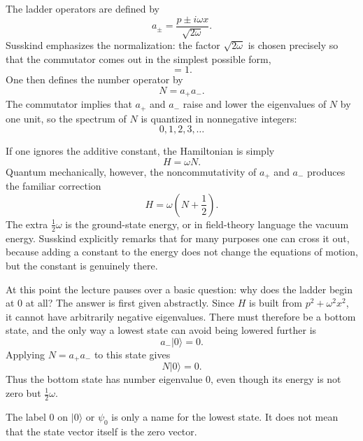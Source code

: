 The ladder operators are defined by
\begin{equation}
a_{\pm}=\frac{p\pm i\omega x}{\sqrt{2\omega}}.
\end{equation}
Susskind emphasizes the normalization: the factor \(\sqrt{2\omega}\) is chosen precisely so that the commutator comes out in the simplest possible form,
\begin{equation}
[a_{-},a_{+}]=1.
\end{equation}
One then defines the number operator by
\begin{equation}
N=a_{+}a_{-}.
\end{equation}
The commutator implies that \(a_{+}\) and \(a_{-}\) raise and lower the eigenvalues of \(N\) by one unit, so the spectrum of \(N\) is quantized in nonnegative integers:
\[
0,1,2,3,\ldots
\]

If one ignores the additive constant, the Hamiltonian is simply
\begin{equation}
H=\omega N.
\end{equation}
Quantum mechanically, however, the noncommutativity of \(a_{+}\) and \(a_{-}\) produces the familiar correction
\begin{equation}
H=\omega\left(N+\frac{1}{2}\right).
\end{equation}
The extra \(\tfrac{1}{2}\omega\) is the ground-state energy, or in field-theory language the vacuum energy. Susskind explicitly remarks that for many purposes one can cross it out, because adding a constant to the energy does not change the equations of motion, but the constant is genuinely there.

At this point the lecture pauses over a basic question: why does the ladder begin at \(0\) at all? The answer is first given abstractly. Since \(H\) is built from \(p^{2}+\omega^{2}x^{2}\), it cannot have arbitrarily negative eigenvalues. There must therefore be a bottom state, and the only way a lowest state can avoid being lowered further is
\begin{equation}
a_{-}|0\rangle=0.
\end{equation}
Applying \(N=a_{+}a_{-}\) to this state gives
\begin{equation}
N|0\rangle=0.
\end{equation}
Thus the bottom state has number eigenvalue \(0\), even though its energy is not zero but \(\tfrac{1}{2}\omega\).

\begin{remark}
The label \(0\) on \(|0\rangle\) or \(\psi_{0}\) is only a name for the lowest state. It does not mean that the state vector itself is the zero vector.
\end{remark}

